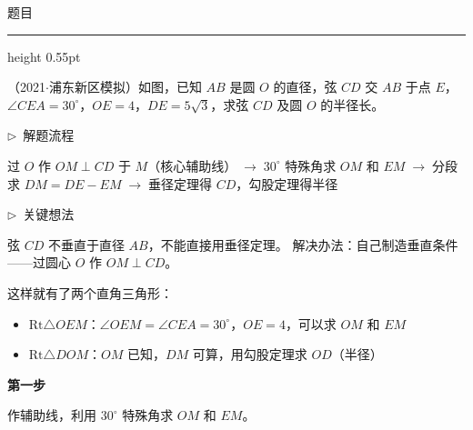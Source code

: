 \documentclass{exam-zh}
\newcommand{\edukai}{\kaishu}
\newenvironment{eduSubQuestionItem}[1]{%
  \needspace{4\baselineskip}%
  \vspace{2mm}
  \par\noindent
  \hangindent=8mm\hangafter=1
  {\color{edu-blue}\bfseries #1}\enspace
  \begingroup
  \color{edu-ink}
}{%
  \endgroup
  \par
  \vspace{3mm}
}
\newenvironment{eduAuxItem}[1]{%
  \needspace{4\baselineskip}%
  \vspace{2mm}
  \par\noindent
  \hangindent=8mm\hangafter=1
  {\color{edu-blue}\edukai $\triangleright$~#1}\enspace
  \begingroup
  \color{edu-ink}
  \edukai
}{%
  \endgroup
  \par
  \vspace{4mm}
}
\newenvironment{eduProblemBlock}[1][题目]{%
  \needspace{8\baselineskip}
  {\small\color{edu-muted}#1}\par
  \vspace{1.5mm}
  {\color{edu-blue}\hrule height 0.55pt}
  \vspace{4.5mm}
  \begingroup
  \color{edu-ink}
  \large
  \setlength{\parskip}{2.2mm}
  \linespread{1.20}\selectfont
}{%
  \par
  \endgroup
  \vspace{6mm}
}
\begin{document}
\begin{eduProblemBlock}[题目]
（2021$\cdot$浦东新区模拟）如图，已知 $AB$ 是圆 $O$ 的直径，弦 $CD$ 交 $AB$ 于点 $E$，$\angle CEA = 30^\circ$，$OE = 4$，$DE = 5\sqrt{3}$，求弦 $CD$ 及圆 $O$ 的半径长。

\end{eduProblemBlock}









\begin{eduAuxItem}{解题流程}
过 $O$ 作 $OM \perp CD$ 于 $M$（核心辅助线）$\;\to\;$$30^\circ$ 特殊角求 $OM$ 和 $EM$$\;\to\;$分段求 $DM = DE - EM$$\;\to\;$垂径定理得 $CD$，勾股定理得半径\end{eduAuxItem}




\begin{eduAuxItem}{关键想法}
弦 $CD$ 不垂直于直径 $AB$，不能直接用垂径定理。
解决办法：自己制造垂直条件——过圆心 $O$ 作 $OM \perp CD$。

这样就有了两个直角三角形：
\begin{itemize}
  \item $\mathrm{Rt}\triangle OEM$：$\angle OEM = \angle CEA = 30^\circ$，$OE = 4$，可以求 $OM$ 和 $EM$
  \item $\mathrm{Rt}\triangle DOM$：$OM$ 已知，$DM$ 可算，用勾股定理求 $OD$（半径）
\end{itemize}
\end{eduAuxItem}




\begin{eduSubQuestionItem}{第一步}
作辅助线，利用 $30^\circ$ 特殊角求 $OM$ 和 $EM$。\end{eduSubQuestionItem}
\end{document}
